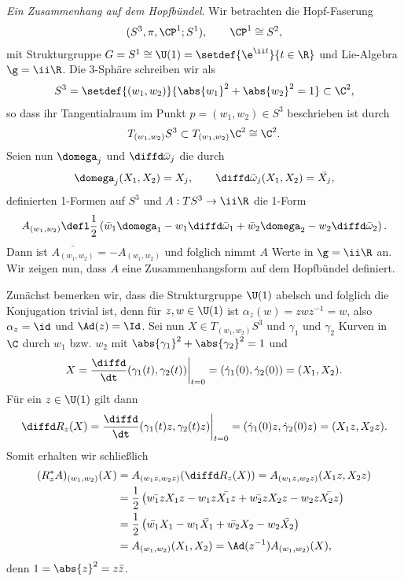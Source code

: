 \documentclass[%
	paper=a5,%
	fleqn,%
	DIV=18,%
	BCOR=0mm,
	fontsize=11pt,
	titlepage=false,%
	bibliography=totoc,
	DIV=18,%
	twoside=true,
	pdftitle=Riemannsche Geometrie,
	pdfauthor=Uwe Semmelmann,
	numbers=noendperiod]%
	{scrbook}
\begin{document}
\begin{ex}
\newcommand{\dqomega}{\diffd \bar{\omega}}
\textit{Ein Zusammenhang auf dem Hopfbündel}.
Wir betrachten die Hopf-Faserung
\begin{align*}
(S^3,\pi,\CP^1;S^1),\qquad \CP^1 \cong S^2,
\end{align*}
mit Strukturgruppe $G = S^1\cong \U(1) = \setdef{\e^{\ii t}}{t\in\R}$ und
Lie-Algebra $\g = \ii\R$. Die 3-Sphäre schreiben wir als
\begin{align*}
S^3 = \setdef{(w_1,w_2)}{\abs{w_1}^2 + \abs{w_2}^2 = 1} \subset\C^2,
\end{align*}
so dass ihr Tangentialraum im Punkt $p=(w_1,w_2)\in S^3$ beschrieben ist durch
\begin{align*}
T_{(w_1,w_2)}S^3\subset T_{(w_1,w_2)}\C^2 \cong \C^2.
\end{align*}
Seien nun $\domega_j$ und $\dqomega_j$ die durch
\begin{align*}
\domega_j(X_1,X_2) = X_j,\qquad \dqomega_j(X_1,X_2) = \bar{X_j},
\end{align*}
definierten 1-Formen auf $S^3$ und $A: TS^3\to \ii\R$ die 1-Form
\begin{align*}
A_{(w_1,w_2)} \defl \frac{1}{2}\left(\bar{w}_1 \domega_1 - w_1\dqomega_1
+ \bar{w}_2 \domega_2 - w_2\dqomega_2\right).
\end{align*}
Dann ist $\bar{A_{(w_1,w_2)}} = - A_{(w_1,w_2)}$ und folglich nimmt $A$ Werte in
$\g = \ii\R$ an.
Wir zeigen nun, dass $A$ eine Zusammenhangsform auf dem
Hopfbündel definiert.

Zunächst bemerken wir, dass die Strukturgruppe $\U(1)$
abelsch und folglich die Konjugation trivial ist, denn für $z,w\in \U(1)$
ist $\alpha_z(w) = zwz^{-1} = w$, also $\alpha_z = \id$ und $\Ad(z) = \Id$.
Sei nun $X\in T_{(w_1,w_2)}S^3$ und $\gamma_1$ und $\gamma_2$ Kurven in $\C$
durch $w_1$ bzw. $w_2$ mit $\abs{\gamma_1}^2 + \abs{\gamma_2}^2
= 1$ und
\begin{align*}
X = \frac{\diffd}{\dt} (\gamma_1(t),\gamma_2(t))\bigg|_{t=0}
= (\dot{\gamma}_1(0),\dot{\gamma}_2(0)) = (X_1,X_2).
\end{align*} 
Für ein $z\in \U(1)$ gilt dann
\begin{align*}
\diffd R_z(X) = \frac{\diffd}{\dt} (\gamma_1(t)z,\gamma_2(t)z)\bigg|_{t=0}
= (\dot{\gamma}_1(0)z,\dot{\gamma}_2(0)z) = (X_1z,X_2z).
\end{align*}
Somit erhalten wir schließlich
\begin{align*}
(R_z^*A)_{(w_1,w_2)}(X) &= A_{(w_1z,w_2z)}(\diffd R_{z}(X))
= A_{(w_1z,w_2z)}(X_1z,X_2z)\\
&= \frac{1}{2}
\left(\bar{w_1z}X_1z - w_1z\bar{X_1z} + \bar{w_2z}X_2z - w_2z\bar{X_2z}
\right)\\
&= \frac{1}{2}
\left(\bar{w_1}X_1 - w_1\bar{X_1} + \bar{w_2}X_2 - w_2\bar{X_2}
\right)\\
&= A_{(w_1,w_2)}(X_1,X_2) = \Ad(z^{-1})A_{(w_1,w_2)}(X), 
\end{align*}
denn $1 = \abs{z}^2 = z\bar{z}$.


\end{ex}
\end{document}
